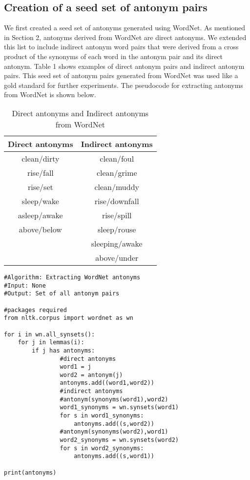 \documentclass[11pt]{article}
\begin{document}
\subsection{Creation of a seed set of antonym pairs}
We first created a seed set of antonyms generated using WordNet. As mentioned in Section 2, antonyms derived from WordNet are direct antonyms. We extended this list to include indirect antonym word pairs that were derived from a cross product of the synonyms of each word in the antonym pair and its direct antonym. Table 1 shows examples of direct antonym pairs and indirect antonym pairs. This seed set of antonym pairs generated from WordNet was used like a gold standard for further experiments. The pseudocode for extracting antonyms from WordNet is shown below.

\begin{table}
\begin{tabular}[t]{|c|c|}
\hline
Direct antonyms & Indirect antonyms\\
\hline
clean/dirty & clean/foul\\
 rise/fall & clean/grime\\
 rise/set & clean/muddy\\
 sleep/wake & rise/downfall \\
 asleep/awake & rise/spill\\
 above/below & sleep/rouse\\
 & sleeping/awake\\
 & above/under\\
 \hline
\end{tabular}
\caption {Direct antonyms and Indirect antonyms from WordNet}
\end{table}

\begin{lstlisting}
#Algorithm: Extracting WordNet antonyms
#Input: None
#Output: Set of all antonym pairs

#packages required
from nltk.corpus import wordnet as wn

for i in wn.all_synsets():
    for j in lemmas(i):
        if j has antonyms:
                #direct antonyms
                word1 = j
                word2 = antonym(j)
                antonyms.add((word1,word2))
                #indirect antonyms
                #antonym(synonyms(word1),word2)
                word1_synonyms = wn.synsets(word1)
                for s in word1_synonyms:
                    antonyms.add((s,word2))
                #antonym(synonyms(word2),word1)
                word2_synonyms = wn.synsets(word2)
                for s in word2_synonyms:
                    antonyms.add((s,word1))

print(antonyms)

\end{lstlisting}
\end{document}
